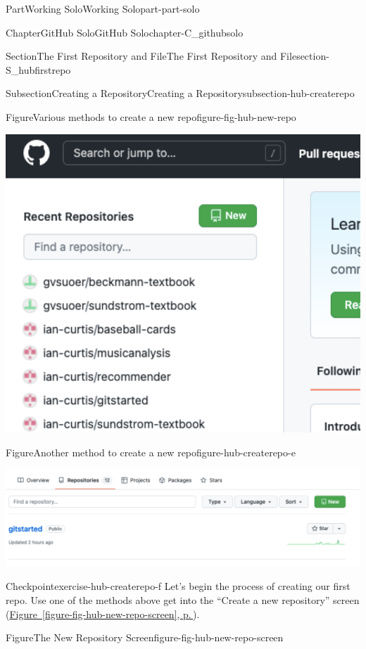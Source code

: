 \documentclass[twoside,10pt,]{book}
\newcommand{\xreffont}{\relax}
\begin{document}
\begin{partptx}{Part}{Working Solo}{}{Working Solo}{}{}{part-part-solo}
\begin{chapterptx}{Chapter}{GitHub Solo}{}{GitHub Solo}{}{}{chapter-C_githubsolo}
\begin{sectionptx}{Section}{The First Repository and File}{}{The First Repository and File}{}{}{section-S_hubfirstrepo}
\begin{subsectionptx}{Subsection}{Creating a Repository}{}{Creating a Repository}{}{}{subsection-hub-createrepo}
\begin{figureptx}{Figure}{Various methods to create a new repo}{figure-fig-hub-new-repo}{}
\begin{sidebyside}{2}{0.025}{0.025}{0.05}
\begin{sbspanel}{0.45}%
\includegraphics[width=\linewidth]{external/hub_new_repo_home.pdf}
\end{sbspanel}%
\end{sidebyside}%
\tcblower
\end{figureptx}%
\begin{figureptx}{Figure}{Another method to create a new repo}{figure-hub-createrepo-e}{}%
\begin{image}{0.05}{0.9}{0.05}{}%
\includegraphics[width=\linewidth]{external/hub_new_repo_yourrepos.pdf}
\end{image}%
\tcblower
\end{figureptx}%
\begin{inlineexercise}{Checkpoint}{}{exercise-hub-createrepo-f}%
Let's begin the process of creating our first repo. Use one of the methods above get into the ``Create a new repository'' screen (\hyperref[figure-fig-hub-new-repo-screen]{Figure~{\xreffont\ref{figure-fig-hub-new-repo-screen}}, p.\,\pageref{figure-fig-hub-new-repo-screen}}).%
\end{inlineexercise}%
\begin{figureptx}{Figure}{The New Repository Screen}{figure-fig-hub-new-repo-screen}{}%

\end{figureptx}
\end{subsectionptx}
\end{sectionptx}
\end{chapterptx}
\end{partptx}
\end{document}
